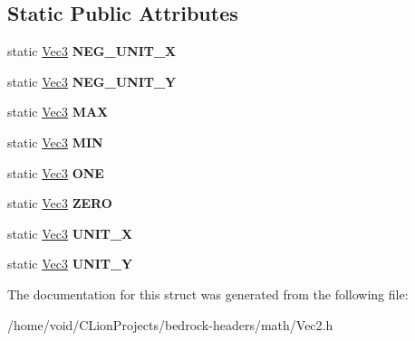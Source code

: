\subsection*{Static Public Attributes}
\begin{DoxyCompactItemize}
\item 
\mbox{\label{struct_vec2_abc77e2f5680182a123d28efbc557b461}} 
static \mbox{\hyperlink{struct_vec3}{Vec3}} {\bfseries N\+E\+G\+\_\+\+U\+N\+I\+T\+\_\+X}
\item 
\mbox{\label{struct_vec2_a96ad45d0d03697fb3e4672165bd450e3}} 
static \mbox{\hyperlink{struct_vec3}{Vec3}} {\bfseries N\+E\+G\+\_\+\+U\+N\+I\+T\+\_\+Y}
\item 
\mbox{\label{struct_vec2_ae3ca947afc229c5998b3ecb94a98e361}} 
static \mbox{\hyperlink{struct_vec3}{Vec3}} {\bfseries M\+AX}
\item 
\mbox{\label{struct_vec2_a8131d65c66c3cb593b168d100063b81f}} 
static \mbox{\hyperlink{struct_vec3}{Vec3}} {\bfseries M\+IN}
\item 
\mbox{\label{struct_vec2_ae6b5bbf62faec6a43f3d12fddbc6c650}} 
static \mbox{\hyperlink{struct_vec3}{Vec3}} {\bfseries O\+NE}
\item 
\mbox{\label{struct_vec2_a876dae2f635bc6b8ef55b39c963b7160}} 
static \mbox{\hyperlink{struct_vec3}{Vec3}} {\bfseries Z\+E\+RO}
\item 
\mbox{\label{struct_vec2_a24fc59df7643463c7fecfc2840ce2f4b}} 
static \mbox{\hyperlink{struct_vec3}{Vec3}} {\bfseries U\+N\+I\+T\+\_\+X}
\item 
\mbox{\label{struct_vec2_ac5193851c56b7ea6230e4843f50bab4b}} 
static \mbox{\hyperlink{struct_vec3}{Vec3}} {\bfseries U\+N\+I\+T\+\_\+Y}
\end{DoxyCompactItemize}


The documentation for this struct was generated from the following file\+:\begin{DoxyCompactItemize}
\item 
/home/void/\+C\+Lion\+Projects/bedrock-\/headers/math/Vec2.\+h\end{DoxyCompactItemize}

